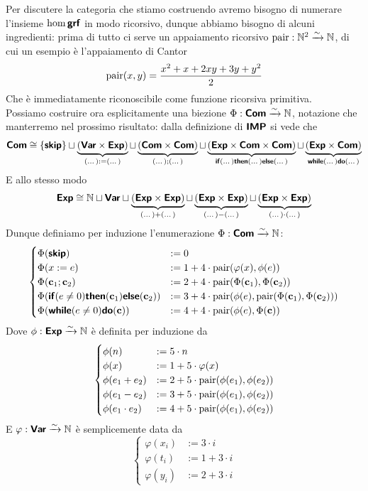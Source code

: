 \documentclass[openany]{book}
\begin{document}
Per discutere la categoria che stiamo costruendo avremo bisogno di numerare l'insieme $\hom\grf$ in modo ricorsivo, dunque abbiamo bisogno di alcuni ingredienti: prima di tutto ci serve un appaiamento ricorsivo $\pair: \N^2\iso\N$, di cui un esempio è l'appaiamento di Cantor
\[ \pair(x,y) = \frac{x^2+x+2xy+3y+y^2}{2} \]
Che è immediatamente riconoscibile come funzione ricorsiva primitiva.\\
Possiamo costruire ora esplicitamente una biezione $\Phi : \Com \iso\N$, notazione che manterremo nel prossimo risultato: dalla definizione di $\imp$ si vede che 
\[ \Com \cong \{\skip\}\sqcup \underbrace{(\Var \times \Exp)}_{(\dots):=(\dots)} \sqcup \underbrace{(\Com\times\Com)}_{(\dots);(\dots)} \sqcup \underbrace{(\Exp \times \Com \times \Com)}_{\ifc(\dots)\then(\dots)\elsec(\dots)} \sqcup \underbrace{(\Exp \times \Com)}_{\while(\dots)\doc(\dots)} \]
E allo stesso modo 
\[ \Exp \cong \N\sqcup\Var \sqcup\underbrace{(\Exp\times\Exp)}_{(\dots)+(\dots)} \sqcup\underbrace{(\Exp\times\Exp)}_{(\dots)-(\dots)} \sqcup\underbrace{(\Exp\times\Exp)}_{(\dots)\cdot(\dots)} \]
Dunque definiamo per induzione l'enumerazione $\Phi : \Com \iso \N$:
\[ \begin{cases}
    \Phi(\skip) & := 0\\
    \Phi(x := e) & := 1+4\cdot \pair(\varphi(x), \phi(e))\\
    \Phi(\c_1; \c_2 ) & := 2+4\cdot \pair(\Phi(\c_1),\Phi(\c_2))\\
    \Phi(\ifc( e\neq 0 )\then( \c_1 )\elsec(\c_2)) & := 3+4\cdot\pair( \phi(e) , \pair(\Phi(\c_1),\Phi(\c_2)) )\\
    \Phi(\while(e\neq 0)\doc(\c)) & := 4+4\cdot\pair(\phi(e), \Phi(\c))
\end{cases} \]
Dove $\phi:\Exp \iso \N$ è definita per induzione da 
\[ \begin{cases}
    \phi(n) & := 5\cdot n \\
    \phi(x) & := 1+5\cdot \varphi(x)\\
    \phi(e_1 + e_2) & := 2 + 5\cdot \pair(\phi(e_1),\phi(e_2))\\
    \phi(e_1 - e_2) & := 3 + 5\cdot \pair(\phi(e_1),\phi(e_2))\\
    \phi(e_1 \cdot e_2) & := 4 + 5\cdot \pair(\phi(e_1),\phi(e_2))
\end{cases} \]
E $\varphi:\Var \iso \N$ è semplicemente data da
\[ \begin{cases}
    \varphi(x_i) & := 3\cdot i \\
    \varphi(t_i) & := 1+3\cdot i \\
    \varphi(y_i) & := 2+3\cdot i
\end{cases} \]
\end{document}
